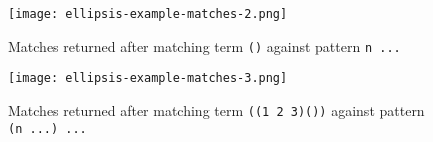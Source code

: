 \begin{figure}[h]
\texttt{[image: ellipsis-example-matches-2.png]}
\caption{Matches returned after matching term \texttt{()} against pattern \texttt{n ...}}
\label{ellipsis-example-matches-2}
\end{figure}

\begin{figure}[h]
\texttt{[image: ellipsis-example-matches-3.png]}
\caption{Matches returned after matching term \texttt{((1 2 3)())} against pattern \texttt{(n ...) ...} }
\label{ellipsis-example-matches-3}
\end{figure}

